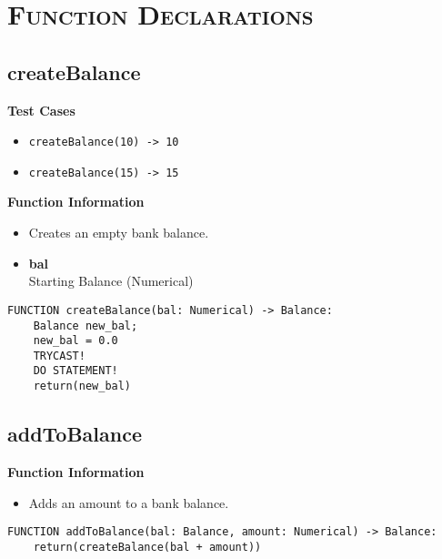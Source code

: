 
\section{\textsc{Function Declarations}}
\clearpage

\subsection{createBalance}
\textbf{Test Cases}
\begin{itemize}
	\setlength{\itemsep}{5pt}
	\setlength{\parskip}{0pt}
	\setlength{\parsep}{0pt}
	\item \verb|createBalance(10) -> 10|
	\item \verb|createBalance(15) -> 15|
\end{itemize}

\textbf{Function Information}
\begin{itemize}
	\setlength{\itemsep}{5pt}
	\setlength{\parskip}{0pt}
	\setlength{\parsep}{0pt}
	\item Creates an empty bank balance.
	\item \textbf{bal} \\ Starting Balance (Numerical)
\end{itemize}

\begin{verbatim}
FUNCTION createBalance(bal: Numerical) -> Balance:
	Balance new_bal;
	new_bal = 0.0
	TRYCAST!
	DO STATEMENT!
	return(new_bal)
\end{verbatim}

\clearpage

\subsection{addToBalance}
\textbf{Function Information}
\begin{itemize}
	\setlength{\itemsep}{5pt}
	\setlength{\parskip}{0pt}
	\setlength{\parsep}{0pt}
	\item Adds an amount to a bank balance.
\end{itemize}

\begin{verbatim}
FUNCTION addToBalance(bal: Balance, amount: Numerical) -> Balance:
	return(createBalance(bal + amount))
\end{verbatim}

\clearpage

